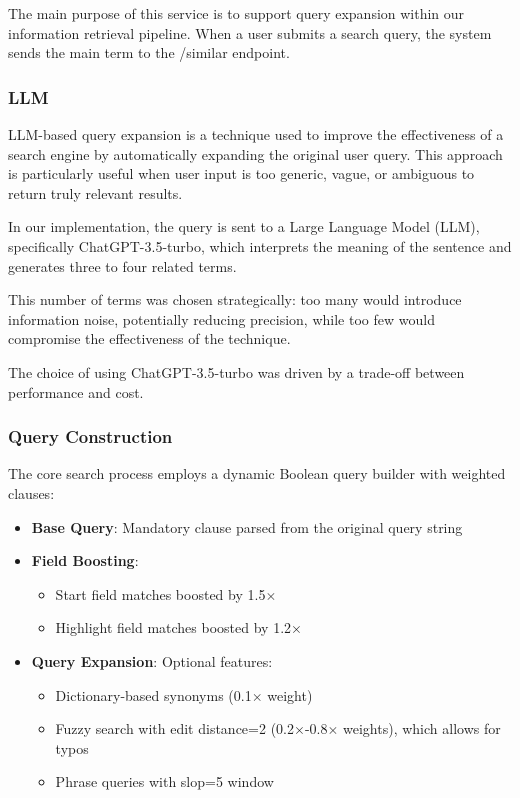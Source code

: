 The main purpose of this service is to support query expansion within our information retrieval pipeline. When a user submits a search query, the system sends the main term to the /similar endpoint.

\subsubsection{LLM}
\label{subsubsec:LLM}
LLM-based query expansion is a technique used to improve the effectiveness of a search engine by automatically expanding the original user query. This approach is particularly useful when user input is too generic, vague, or ambiguous to return truly relevant results.

In our implementation, the query is sent to a Large Language Model (LLM), specifically ChatGPT-3.5-turbo, which interprets the meaning of the sentence and generates three to four related terms.

This number of terms was chosen strategically: too many would introduce information noise, potentially reducing precision, while too few would compromise the effectiveness of the technique.

The choice of using ChatGPT-3.5-turbo was driven by a trade-off between performance and cost.

\subsubsection{Query Construction}
\label{subsubsec:Query Construction}
The core search process employs a dynamic Boolean query builder with weighted clauses:

\begin{itemize}
    \item \textbf{Base Query}: Mandatory clause parsed from the original query string
    \item \textbf{Field Boosting}:
    \begin{itemize}
        \item Start field matches boosted by 1.5$\times$
        \item Highlight field matches boosted by 1.2$\times$
    \end{itemize}
    \item \textbf{Query Expansion}: Optional features:
    \begin{itemize}
        \item Dictionary-based synonyms (0.1$\times$ weight)
        \item Fuzzy search with edit distance=2 (0.2$\times$-0.8$\times$ weights), which allows for typos
        \item Phrase queries with slop=5 window
    \end{itemize}
\end{itemize}

